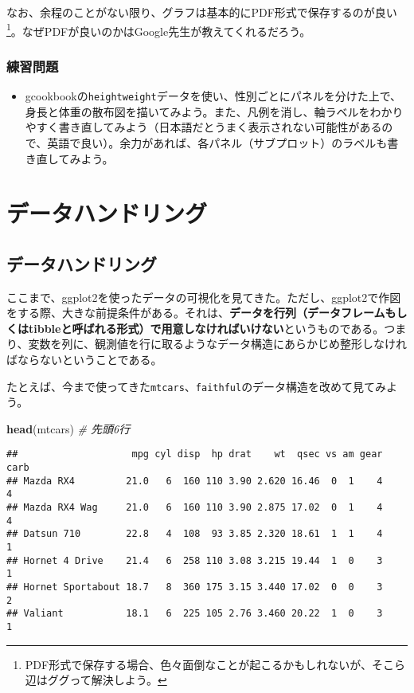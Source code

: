 \documentclass[]{book}
\newenvironment{Shaded}{\begin{snugshade}}{\end{snugshade}}
\newcommand{\KeywordTok}[1]{\textcolor[rgb]{0.13,0.29,0.53}{\textbf{#1}}}
\newcommand{\CommentTok}[1]{\textcolor[rgb]{0.56,0.35,0.01}{\textit{#1}}}
\newcommand{\NormalTok}[1]{#1}
\providecommand{\tightlist}{%
  \setlength{\itemsep}{0pt}\setlength{\parskip}{0pt}}
\let\rmarkdownfootnote\footnote%
\def\footnote{\protect\rmarkdownfootnote}
\begin{document}
なお、余程のことがない限り、グラフは基本的にPDF形式で保存するのが良い\footnote{PDF形式で保存する場合、色々面倒なことが起こるかもしれないが、そこら辺はググって解決しよう。}。なぜPDFが良いのかはGoogle先生が教えてくれるだろう。

\section{練習問題}\label{-5}

\begin{itemize}
\tightlist
\item
  gcookbookの\texttt{heightweight}データを使い、性別ごとにパネルを分けた上で、身長と体重の散布図を描いてみよう。また、凡例を消し、軸ラベルをわかりやすく書き直してみよう（日本語だとうまく表示されない可能性があるので、英語で良い）。余力があれば、各パネル（サブプロット）のラベルも書き直してみよう。
\end{itemize}

\part*{データハンドリング}\label{part-}

\chapter{データハンドリング}\label{data-handling}

ここまで、ggplot2を使ったデータの可視化を見てきた。ただし、ggplot2で作図をする際、大きな前提条件がある。それは、\textbf{データを行列（データフレームもしくはtibbleと呼ばれる形式）で用意しなければいけない}というものである。つまり、変数を列に、観測値を行に取るようなデータ構造にあらかじめ整形しなければならないということである。

たとえば、今まで使ってきた\texttt{mtcars}、\texttt{faithful}のデータ構造を改めて見てみよう。

\begin{Shaded}
\begin{Highlighting}[]
\KeywordTok{head}\NormalTok{(mtcars) }\CommentTok{# 先頭6行}
\end{Highlighting}
\end{Shaded}

\begin{verbatim}
##                    mpg cyl disp  hp drat    wt  qsec vs am gear carb
## Mazda RX4         21.0   6  160 110 3.90 2.620 16.46  0  1    4    4
## Mazda RX4 Wag     21.0   6  160 110 3.90 2.875 17.02  0  1    4    4
## Datsun 710        22.8   4  108  93 3.85 2.320 18.61  1  1    4    1
## Hornet 4 Drive    21.4   6  258 110 3.08 3.215 19.44  1  0    3    1
## Hornet Sportabout 18.7   8  360 175 3.15 3.440 17.02  0  0    3    2
## Valiant           18.1   6  225 105 2.76 3.460 20.22  1  0    3    1
\end{verbatim}
\end{document}
